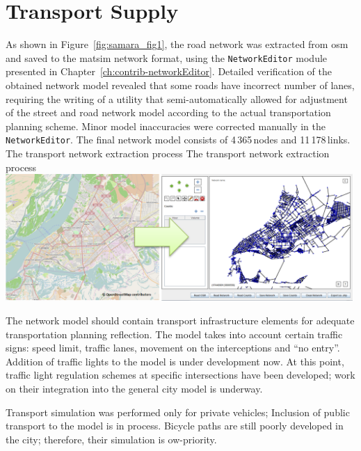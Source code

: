\section{Transport Supply}
As shown in Figure~\ref{fig:samara_fig1}, the road network was extracted from \gls{osm} and saved to the \gls{matsim} network format, using the \lstinline|NetworkEditor| module presented in Chapter~\ref{ch:contrib-networkEditor}. 
Detailed verification of the obtained network model revealed that some roads have incorrect number of lanes, requiring the writing of a utility that semi-automatically allowed for adjustment of the street and road network model according to the actual transportation planning scheme. Minor model inaccuracies were corrected manually in the \lstinline|NetworkEditor|. The final network model consists of 4\,365\,nodes and 11\,178\,links.
%
\createfigure%
{The transport network extraction process}%
{The transport network extraction process}%
{\label{fig:samara_fig1}}%
{\includegraphics[width=0.99\textwidth, angle=0]{./scenarios/figures/samara_fig1.png}}%
{}

The network model should contain transport infrastructure elements for adequate transportation planning reflection. The model takes into account certain traffic signs: speed limit, traffic lanes, movement on the interceptions and ``no entry''. Addition of traffic lights to the model is under development now. At this point, traffic light regulation schemes at specific intersections have been developed; work on their integration into the general city model is underway.

Transport simulation was performed only for private vehicles; Inclusion of public transport to the model is in process. Bicycle paths are still poorly developed in the city; therefore, their simulation is ow-priority. 

